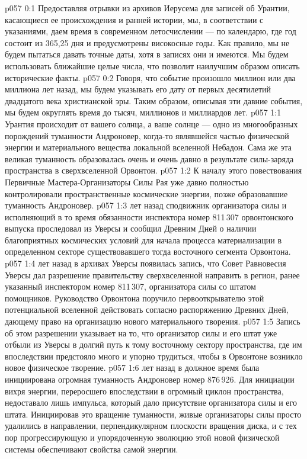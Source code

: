 \author{Носитель Жизни}
\vs p057 0:1 Предоставляя отрывки из архивов Иерусема для записей об Урантии, касающиеся ее происхождения и ранней истории, мы, в соответствии с указаниями, даем время в современном летосчислении --- по календарю, где год состоит из 365,25 дня и предусмотрены високосные годы. Как правило, мы не будем пытаться давать точные даты, хотя в записях они и имеются. Мы будем использовать ближайшие целые числа, что позволит наилучшим образом описать исторические факты.
\vs p057 0:2 Говоря, что событие произошло миллион или два миллиона лет назад, мы будем указывать его дату от первых десятилетий двадцатого века христианской эры. Таким образом, описывая эти давние события, мы будем округлять время до тысяч, миллионов и миллиардов лет.
\vs p057 1:1 Урантия происходит от вашего солнца, а ваше солнце --- одно из многообразных порождений туманности Андроновер, когда\hyp{}то являвшейся частью физической энергии и материального вещества локальной вселенной Небадон. Сама же эта великая туманность образовалась очень и очень давно в результате силы\hyp{}заряда пространства в сверхвселенной Орвонтон.
\vs p057 1:2 К началу этого повествования Первичные Мастера\hyp{}Организаторы Силы Рая уже давно полностью контролировали пространственные космические энергии, позже образовавшие туманность Андроновер.
\vs p057 1:3 \pc {} лет назад сподвижник организатора силы и исполняющий в то время обязанности инспектора номер 811\,307 орвонтонского выпуска проследовал из Уверсы и сообщил Древним Дней о наличии благоприятных космических условий для начала процесса материализации в определенном секторе существовавшего тогда восточного сегмента Орвонтона.
\vs p057 1:4 \pc {} лет назад в архивах Уверсы появилась запись, что Совет Равновесия Уверсы дал разрешение правительству сверхвселенной направить в регион, ранее указанный инспектором номер 811\,307, организатора силы со штатом помощников. Руководство Орвонтона поручило первооткрывателю этой потенциальной вселенной действовать согласно распоряжению Древних Дней, дающему право на организацию нового материального творения.
\vs p057 1:5 Запись об этом разрешении указывает на то, что организатор силы и его штат уже отбыли из Уверсы в долгий путь к тому восточному сектору пространства, где им впоследствии предстояло много и упорно трудиться, чтобы в Орвонтоне возникло новое физическое творение.
\vs p057 1:6 \pc {} лет назад в должное время была инициирована огромная туманность Андроновер номер 876\,926. Для инициации вихря энергии, переросшего впоследствии в огромный циклон пространства, недоставало лишь импульса, который дало присутствие организатора силы и его штата. Инициировав это вращение туманности, живые организаторы силы просто удалились в направлении, перпендикулярном плоскости вращения диска, и с тех пор прогрессирующую и упорядоченную эволюцию этой новой физической системы обеспечивают свойства самой энергии.
